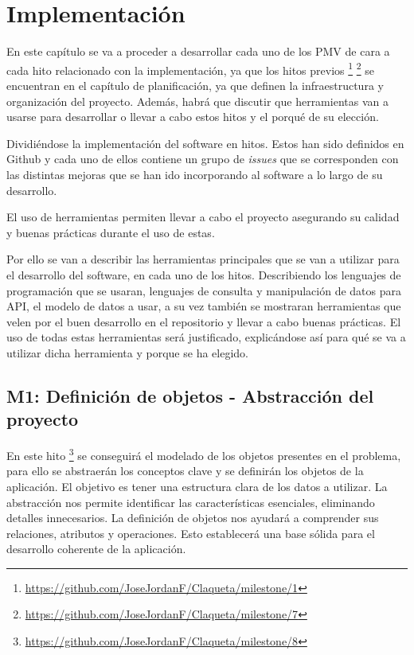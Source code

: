 \chapter{Implementación}

En este capítulo se va a proceder a desarrollar cada uno de los PMV de cara a cada hito relacionado con 
la implementación, ya que los hitos previos \footnote{\url{https://github.com/JoseJordanF/Claqueta/milestone/1}} \footnote{\url{https://github.com/JoseJordanF/Claqueta/milestone/7}} se encuentran en el capítulo de 
planificación, ya que definen la infraestructura y organización del proyecto. Además, habrá que 
discutir que herramientas van a usarse para desarrollar o llevar a cabo estos hitos y el porqué de su 
elección. 

Dividiéndose la implementación del software en hitos. Estos han sido definidos en Github
y cada uno de ellos contiene un grupo de \textit{issues} que se corresponden con las distintas
mejoras que se han ido incorporando al software a lo largo de su desarrollo.

El uso de herramientas permiten llevar a cabo el proyecto asegurando su calidad y buenas prácticas 
durante el uso de estas.

Por ello se van a describir las herramientas principales que se van a utilizar para el desarrollo del 
software, en cada uno de los hitos. Describiendo los lenguajes de programación que se usaran, lenguajes 
de consulta y manipulación de datos para API, el modelo de datos a usar, a su vez también se mostraran 
herramientas que velen por el buen desarrollo en el repositorio y llevar a cabo buenas prácticas. El 
uso de todas estas herramientas será justificado, explicándose así para qué se va a utilizar dicha 
herramienta y porque se ha elegido.

\section{M1: Definición de objetos - Abstracción del proyecto}

En este hito \footnote{\url{https://github.com/JoseJordanF/Claqueta/milestone/8}} se conseguirá el modelado 
de los objetos presentes en el problema, para ello se abstraerán los conceptos clave y se definirán los objetos 
de la aplicación. El objetivo es tener una estructura clara de los datos a utilizar. La abstracción nos permite 
identificar las características esenciales, eliminando detalles innecesarios. La definición de objetos nos 
ayudará a comprender sus relaciones, atributos y operaciones. Esto establecerá una base sólida para el desarrollo
coherente de la aplicación.

